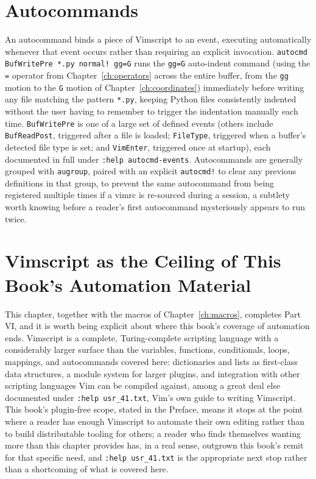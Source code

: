 \section{Autocommands}

An autocommand binds a piece of Vimscript to an event, executing automatically whenever that event occurs rather than requiring an explicit invocation. \texttt{autocmd BufWritePre *.py normal! gg=G} runs the \texttt{gg=G} auto-indent command (using the \texttt{=} operator from Chapter~\ref{ch:operators} across the entire buffer, from the \texttt{gg} motion to the \texttt{G} motion of Chapter~\ref{ch:coordinates}) immediately before writing any file matching the pattern \texttt{*.py}, keeping Python files consistently indented without the user having to remember to trigger the indentation manually each time. \texttt{BufWritePre} is one of a large set of defined events (others include \texttt{BufReadPost}, triggered after a file is loaded; \texttt{FileType}, triggered when a buffer's detected file type is set; and \texttt{VimEnter}, triggered once at startup), each documented in full under \texttt{:help autocmd-events}. Autocommands are generally grouped with \texttt{augroup}, paired with an explicit \texttt{autocmd!} to clear any previous definitions in that group, to prevent the same autocommand from being registered multiple times if a vimrc is re-sourced during a session, a subtlety worth knowing before a reader's first autocommand mysteriously appears to run twice.

\section{Vimscript as the Ceiling of This Book's Automation Material}

This chapter, together with the macros of Chapter~\ref{ch:macros}, completes Part VI, and it is worth being explicit about where this book's coverage of automation ends. Vimscript is a complete, Turing-complete scripting language with a considerably larger surface than the variables, functions, conditionals, loops, mappings, and autocommands covered here: dictionaries and lists as first-class data structures, a module system for larger plugins, and integration with other scripting languages Vim can be compiled against, among a great deal else documented under \texttt{:help usr\_41.txt}, Vim's own guide to writing Vimscript. This book's plugin-free scope, stated in the Preface, means it stops at the point where a reader has enough Vimscript to automate their own editing rather than to build distributable tooling for others; a reader who finds themselves wanting more than this chapter provides has, in a real sense, outgrown this book's remit for that specific need, and \texttt{:help usr\_41.txt} is the appropriate next stop rather than a shortcoming of what is covered here.
